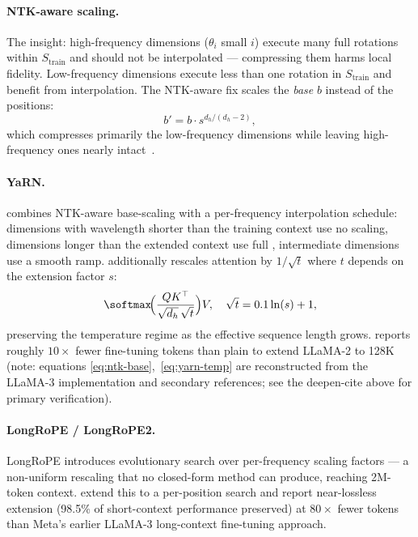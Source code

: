 \paragraph{NTK-aware scaling.} The insight: high-frequency dimensions
($\theta_i$ small $i$) execute many full rotations within $S_{\text{train}}$
and should not be interpolated --- compressing them harms local
fidelity. Low-frequency dimensions execute less than one rotation in
$S_{\text{train}}$ and benefit from interpolation. The NTK-aware fix
scales the \emph{base} $b$ instead of the positions:
\begin{equation}
b' = b \cdot s^{d_h / (d_h - 2)},
\label{eq:ntk-base}
\end{equation}
which compresses primarily the low-frequency dimensions while leaving
high-frequency ones nearly intact~\citep[\S 3.2,
\nolinkurl{kb/notes/architecture/position-encoding.md#sec-3-2}]{su2021}.

\paragraph{YaRN.}   combines
NTK-aware base-scaling with a per-frequency interpolation
schedule: dimensions with wavelength shorter than the training context
use no scaling, dimensions longer than the extended context use full
, intermediate dimensions use a smooth ramp.  additionally
rescales attention  by $1/\sqrt{t}$ where $t$ depends on the
extension factor $s$:
\begin{equation}
\softmax\!\Bigl(\frac{Q K^\top}{\sqrt{d_h}\,\sqrt{t}}\Bigr) V,
\quad \sqrt{t} = 0.1 \ln(s) + 1,
\label{eq:yarn-temp}
\end{equation}
preserving the  temperature regime as the effective sequence
length grows.  reports roughly $10\times$ fewer fine-tuning tokens
than plain  to extend LLaMA-2 to 128K (note: equations
\eqref{eq:ntk-base},~\eqref{eq:yarn-temp} are reconstructed from the
LLaMA-3 implementation and secondary references; see the deepen-cite
above for primary verification).

\paragraph{LongRoPE / LongRoPE2.} LongRoPE introduces evolutionary
search over per-frequency scaling factors --- a non-uniform rescaling
that no closed-form method can produce, reaching 2M-token context.
\citet{longrope2-2025} extend this to a per-position search and report
near-lossless extension (98.5\% of short-context performance preserved)
at $80\times$ fewer tokens than Meta's earlier LLaMA-3 long-context
fine-tuning approach.

